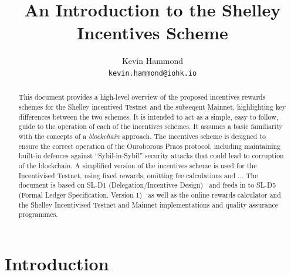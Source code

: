 \documentclass[11pt,a4paper,dvipsnames,twosided]{article}
\begin{document}
\renewcommand{\thepage}{\arabic{page}}
\setcounter{page}{1}

\title{An Introduction to the Shelley Incentives Scheme}

\author{Kevin Hammond  \\ {\small \texttt{kevin.hammond@iohk.io}}}

\maketitle

\begin{abstract}
  \noindent
  This document provides a high-level overview of the proposed incentives rewards schemes for
  the Shelley incentived Testnet and the subseqent Mainnet, highlighting key
  differences between the two schemes.  It is intended to act as a
  simple, easy to follow, guide to the operation of each of the incentives schemes.
  It assumes a basic familiarity with the concepts of a \emph{blockchain} approach.
  The incentives scheme is designed to ensure the correct operation of the Ouroborous Praos
  protocol, including maintaining built-in defences against ``Sybil-in-Sybil'' security attacks
  that could lead to corruption of the blockchain.
  A simplified version of the incentives scheme is used for the Incentivised Testnet, using fixed rewards,
  omitting fee calculations and ...
  The document is based on SL-D1 (Delegation/Incentives Design)~\cite{delegation_design} and feeds in to SL-D5
  (Formal Ledger Specification. Version 1)~\cite{shelley_ledger_spec} as well as the online rewards calculator and the Shelley Incentivised Testnet and Mainnet  implementations and quality assurance programmes.
\end{abstract}

\section{Introduction}
\label{sec:introduction}
\end{document}

